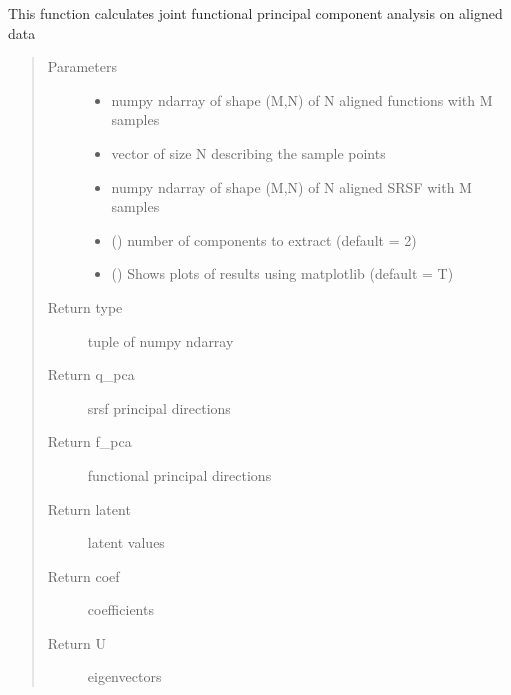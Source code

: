 \documentclass[letterpaper,10pt,english]{sphinxmanual}
\begin{document}
\begin{fulllineitems}
\label{\detokenize{fPCA:fPCA.jointfPCA}}
This function calculates joint functional principal component analysis
on aligned data
\begin{quote}\begin{description}
\item[{Parameters}] \leavevmode\begin{itemize}
\item {} 
 \textendash{} numpy ndarray of shape (M,N) of N aligned functions with M
samples

\item {} 
 \textendash{} vector of size N describing the sample points

\item {} 
 \textendash{} numpy ndarray of shape (M,N) of N aligned SRSF with M samples

\item {} 
 () \textendash{} number of components to extract (default = 2)

\item {} 
 () \textendash{} Shows plots of results using matplotlib (default = T)

\end{itemize}

\item[{Return type}] \leavevmode
tuple of numpy ndarray

\item[{Return q\_pca}] \leavevmode
srsf principal directions

\item[{Return f\_pca}] \leavevmode
functional principal directions

\item[{Return latent}] \leavevmode
latent values

\item[{Return coef}] \leavevmode
coefficients

\item[{Return U}] \leavevmode
eigenvectors

\end{description}\end{quote}

\end{fulllineitems}
\end{document}
